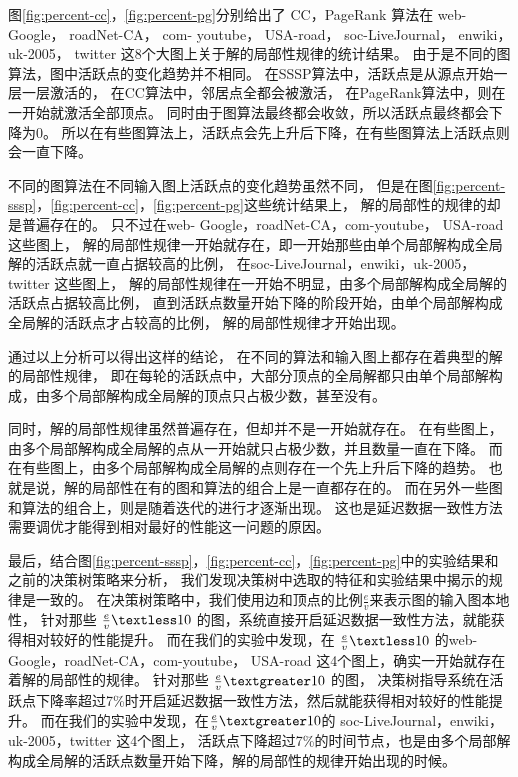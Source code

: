 图\ref{fig:percent-cc}，\ref{fig:percent-pg}分别给出了 
CC，PageRank 算法在 web-Google， roadNet-CA， com- youtube， USA-road， 
soc-LiveJournal， enwiki， uk-2005， twitter 
这8个大图上关于解的局部性规律的统计结果。
由于是不同的图算法，图中活跃点的变化趋势并不相同。
在SSSP算法中，活跃点是从源点开始一层一层激活的，
在CC算法中，邻居点全都会被激活，
在PageRank算法中，则在一开始就激活全部顶点。
同时由于图算法最终都会收敛，所以活跃点最终都会下降为0。
所以在有些图算法上，活跃点会先上升后下降，在有些图算法上活跃点则会一直下降。

不同的图算法在不同输入图上活跃点的变化趋势虽然不同，
但是在图\ref{fig:percent-sssp}，\ref{fig:percent-cc}，\ref{fig:percent-pg}这些统计结果上，
解的局部性的规律的却是普遍存在的。
只不过在web- Google，roadNet-CA，com-youtube， USA-road 这些图上，
解的局部性规律一开始就存在，即一开始那些由单个局部解构成全局解的活跃点就一直占据较高的比例，
在soc-LiveJournal，enwiki，uk-2005，twitter 这些图上，
解的局部性规律在一开始不明显，由多个局部解构成全局解的活跃点占据较高比例，
直到活跃点数量开始下降的阶段开始，由单个局部解构成全局解的活跃点才占较高的比例，
解的局部性规律才开始出现。


通过以上分析可以得出这样的结论，
在不同的算法和输入图上都存在着典型的解的局部性规律，
即在每轮的活跃点中，大部分顶点的全局解都只由单个局部解构成，由多个局部解构成全局解的顶点只占极少数，甚至没有。

同时，解的局部性规律虽然普遍存在，但却并不是一开始就存在。
在有些图上，由多个局部解构成全局解的点从一开始就只占极少数，并且数量一直在下降。
而在有些图上，由多个局部解构成全局解的点则存在一个先上升后下降的趋势。
也就是说，解的局部性在有的图和算法的组合上是一直都存在的。
而在另外一些图和算法的组合上，则是随着迭代的进行才逐渐出现。
这也是延迟数据一致性方法需要调优才能得到相对最好的性能这一问题的原因。


最后，结合图\ref{fig:percent-sssp}，\ref{fig:percent-cc}，\ref{fig:percent-pg}中的实验结果和之前的决策树策略来分析，
我们发现决策树中选取的特征和实验结果中揭示的规律是一致的。
在决策树策略中，我们使用边和顶点的比例$\frac{e}{v}$来表示图的输入图本地性，
针对那些 $\frac{e}{v} \textless 10$  的图，系统直接开启延迟数据一致性方法，就能获得相对较好的性能提升。
而在我们的实验中发现，在 $\frac{e}{v} \textless 10$ 的web-Google，roadNet-CA，com-youtube，
USA-road 这4个图上，确实一开始就存在着解的局部性的规律。
针对那些 $\frac{e}{v} \textgreater 10$ 的图， 决策树指导系统在活跃点下降率超过7\%时开启延迟数据一致性方法，然后就能获得相对较好的性能提升。
而在我们的实验中发现，在$\frac{e}{v} \textgreater 10$的 soc-LiveJournal，enwiki，uk-2005，twitter 这4个图上，
活跃点下降超过7\%的时间节点，也是由多个局部解构成全局解的活跃点数量开始下降，解的局部性的规律开始出现的时候。

